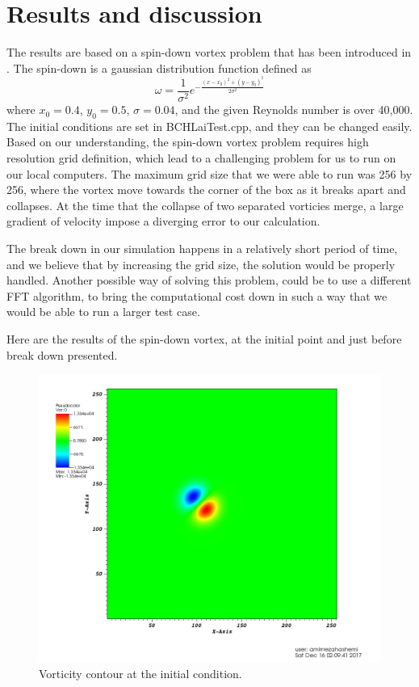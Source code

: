 \documentclass{article}
\begin{document}
\section{Results and discussion}

The results are based on a spin-down vortex problem that has been introduced in \cite{howel1997}. The spin-down is a gaussian distribution function defined as 
\begin{equation}
	\omega = \frac{1}{\sigma^2} e^{-\frac{(x-x_0)^2+(y-y_0)^2}{2 \sigma^2}}
\end{equation}
where $x_0 = 0.4$, $y_0 = 0.5$, $\sigma = 0.04$, and the given Reynolds number is over 40,000. The initial conditions are set in BCHLaiTest.cpp, and they can be changed easily. Based on our understanding, the spin-down vortex problem requires high resolution grid definition, which lead to a challenging problem for us to run on our local computers. The maximum grid size that we were able to run was 256 by 256, where the vortex move towards the corner of the box as it breaks apart and collapses. At the time that the collapse of two separated vorticies merge, a large gradient of velocity impose a diverging error to our calculation.

The break down in our simulation happens in a relatively short period of time, and we believe that by increasing the grid size, the solution would be properly handled. Another possible way of solving this problem, could be to use a different FFT algorithm, to bring the computational cost down in such a way that we would be able to run a larger test case.

Here are the results of the spin-down vortex, at the initial point and just before break down presented.
    \begin{figure}
    \centering
     \includegraphics[scale=0.4]{fig1}
     \caption{Vorticity contour at the initial condition.}
   \end{figure}
   
\end{document}
